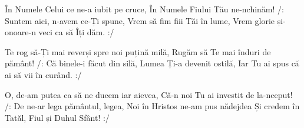 \beginverse
În Numele Celui ce ne-a iubit pe cruce,
În Numele Fiului Tău ne-nchinăm!
/: Suntem aici, n-avem ce-Ți spune,
Vrem să fim fiii Tăi în lume,
Vrem glorie și-onoare-n veci ca să Îți dăm. :/
\endverse

\beginverse
Te rog să-Ți mai reverși spre noi puțină milă,
Rugăm să Te mai înduri de pământ!
/: Că binele-i făcut din silă,
Lumea Ți-a devenit ostilă,
Iar Tu ai spus că ai să vii în curând. :/
\endverse

\beginverse
O, de-am putea ca să ne ducem iar aievea,
Că-n noi Tu ai investit de la-nceput!
/: De ne-ar lega pământul, legea,
Noi în Hristos ne-am pus nădejdea
Și credem în Tatăl, Fiul și Duhul Sfânt! :/
\endverse
\endsong